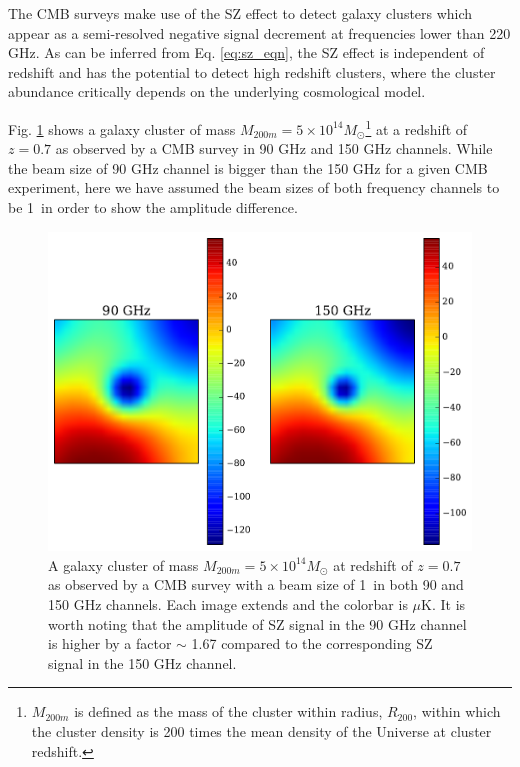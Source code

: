 The CMB surveys make use of the SZ effect to detect galaxy clusters which appear as a semi-resolved negative signal decrement at frequencies lower than 220 GHz.
As can be inferred from Eq. \ref{eq:sz_eqn}, the SZ effect is independent of redshift and has the potential to detect high redshift clusters, where the cluster abundance critically depends on the underlying cosmological model.

Fig. \ref{fig:clus_in_cmb} shows a galaxy cluster of mass $M_{200m}= 5 \times 10^{14} M_{\odot}$\footnote{$M_{200m}$ is defined as the mass of the cluster within radius, $R_{200}$, within which the cluster density is 200 times the mean density of the Universe at cluster redshift.}  at a redshift of $z = 0.7$ as observed by a CMB survey in 90 GHz and 150 GHz channels. While the beam size of 90 GHz channel is bigger than the 150 GHz for a given CMB experiment, here we have assumed the beam sizes of both frequency channels to be 1\am\ in order to show the amplitude difference.  
\begin{figure}[ht]
\includegraphics[width=\linewidth]{figs/clus_in_cmb_new}
\caption{A galaxy cluster of mass $M_{200m} = 5 \times 10^{14} M_{\odot}$ at redshift of $z = 0.7$ as observed by a CMB survey with a beam size of 1\am\ in both 90 and 150 GHz channels.  %
 Each image extends \smallboxsize \; and the colorbar is $\mu$K. It is worth noting that the amplitude of SZ signal in the 90 GHz channel is higher by a factor $\sim$ 1.67 compared to the corresponding SZ signal in the 150 GHz channel.}
\label{fig:clus_in_cmb}
\end{figure}
 

